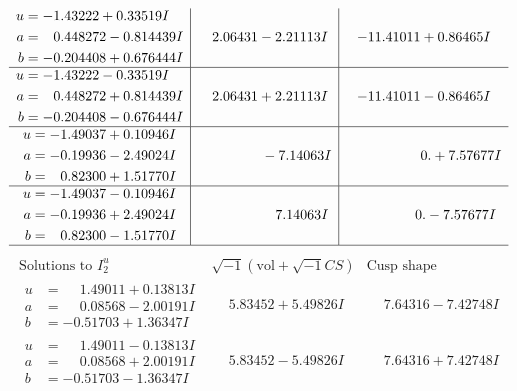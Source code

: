 \documentclass[1p]{elsarticle_modified}
\theoremstyle{definition}
\newcommand{\I}{\sqrt{-1}}
\begin{document}
$$\begin{array}{c|c|c}
\begin{aligned}
u &= -1.43222 + 0.33519 I \\
a &= \phantom{-}0.448272 - 0.814439 I \\
b &= -0.204408 + 0.676444 I\end{aligned}
 & \phantom{-}2.06431 - 2.21113 I & -11.41011 + 0.86465 I \\ \hline\begin{aligned}
u &= -1.43222 - 0.33519 I \\
a &= \phantom{-}0.448272 + 0.814439 I \\
b &= -0.204408 - 0.676444 I\end{aligned}
 & \phantom{-}2.06431 + 2.21113 I & -11.41011 - 0.86465 I \\ \hline\begin{aligned}
u &= -1.49037 + 0.10946 I \\
a &= -0.19936 - 2.49024 I \\
b &= \phantom{-}0.82300 + 1.51770 I\end{aligned}
 & \phantom{-0.000000 } -7.14063 I & \phantom{-0.000000 -}0. + 7.57677 I \\ \hline\begin{aligned}
u &= -1.49037 - 0.10946 I \\
a &= -0.19936 + 2.49024 I \\
b &= \phantom{-}0.82300 - 1.51770 I\end{aligned}
 & \phantom{-0.000000 -}7.14063 I & \phantom{-0.000000 } 0. - 7.57677 I\\
 \hline 
 \end{array}$$\newpage$$\begin{array}{c|c|c}  
\text{Solutions to }I^u_{2}& \I (\text{vol} + \sqrt{-1}CS) & \text{Cusp shape}\\
 \hline 
\begin{aligned}
u &= \phantom{-}1.49011 + 0.13813 I \\
a &= \phantom{-}0.08568 - 2.00191 I \\
b &= -0.51703 + 1.36347 I\end{aligned}
 & \phantom{-}5.83452 + 5.49826 I & \phantom{-}7.64316 - 7.42748 I \\ \hline\begin{aligned}
u &= \phantom{-}1.49011 - 0.13813 I \\
a &= \phantom{-}0.08568 + 2.00191 I \\
b &= -0.51703 - 1.36347 I\end{aligned}
 & \phantom{-}5.83452 - 5.49826 I & \phantom{-}7.64316 + 7.42748 I \\ \hline\begin{aligned}

\end{aligned}
\end{array}$$
\end{document}
